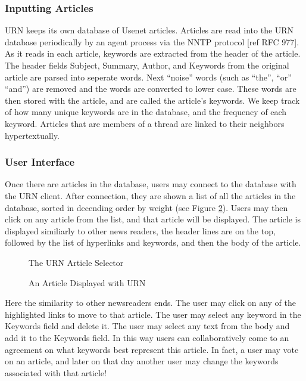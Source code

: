 \subsubsection{Inputting Articles}

URN keeps its own database of Usenet articles. Articles are read into the URN
database periodically by an agent process via the NNTP protocol [ref RFC 977].
As it reads in each article, keywords are extracted from the header of the
article. The header fields Subject, Summary, Author, and Keywords from the
original article are parsed into seperate words. Next ``noise'' words (such as
``the'', ``or'' ``and'') are removed and the words are converted to lower case.
These words are then stored with the article, and are called the article's
keywords. We keep track of how many unique keywords are in the database, and
the frequency of each keyword. Articles that are members of a thread are linked
to their neighbors hypertextually.

\subsubsection{User Interface}

Once there are articles in the database, users may connect to the database with
the URN client. After connection, they are shown a list of all the articles in
the database, sorted in decending order by weight (see Figure \ref{fig:nbuff}).
Users may then click on any article from the list, and that article will be
displayed. The article is displayed similiarly to other news readers, the
header lines are on the top, followed by the list of hyperlinks and keywords,
and then the body of the article.

\begin{figure}[tb]
  \caption{The URN Article Selector}
  \label{fig:sbuff}
\end{figure}

\begin{figure}[tb]
  \caption{An Article Displayed with URN}
  \label{fig:nbuff}
\end{figure}

Here the similarity to other newsreaders ends. The user may click on any of the
highlighted links to move to that article. The user may select any keyword in
the Keywords field and delete it. The user may select any text from the body
and add it to the Keywords field. In this way users can collaboratively come to
an agreement on what keywords best represent this article. In fact, a user may
vote on an article, and later on that day another user may change the keywords
associated with that article!

